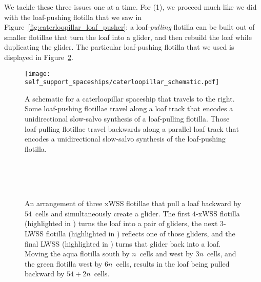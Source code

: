 We tackle these three issues one at a time. For (1), we proceed much like we did with the loaf-pushing flotilla that we saw in Figure~\ref{fig:caterloopillar_loaf_pusher}: a loaf-\emph{pulling} flotilla can be built out of smaller flotillae that turn the loaf into a glider, and then rebuild the loaf while duplicating the glider. The particular loaf-pushing flotilla that we used is displayed in Figure~\ref{fig:caterloopillar_loaf_puller}.

\begin{figure}[!htb]
	\centering
	\texttt{[image: self\_support\_spaceships/caterloopillar\_schematic.pdf]}
	\caption{A schematic for a caterloopillar spaceship that travels to the right. Some loaf-pushing flotillae travel along a loaf track that encodes a unidirectional slow-salvo synthesis of a loaf-pulling flotilla. Those loaf-pulling flotillae travel backwards along a parallel loaf track that encodes a unidirectional slow-salvo synthesis of the loaf-pushing flotilla.}\label{fig:caterloopillar_schematic}
\end{figure}

\begin{figure}[!htb]
	\centering
	 \\[1em]
	
	 \\[1em]
	
	 \\[1em]
	
	
	\caption{An arrangement of three xWSS flotillae that pull a loaf backward by $54$~cells and simultaneously create a glider. The first $4$-xWSS flotilla (highlighted in ) turns the loaf into a pair of gliders, the next $3$-LWSS flotilla (highlighted in ) reflects one of those gliders, and the final LWSS (highlighted in ) turns that glider back into a loaf. Moving the aqua flotilla south by $n$~cells and west by $3n$~cells, and the green flotilla west by $6n$~cells, results in the loaf being pulled backward by $54 + 2n$~cells.}\label{fig:caterloopillar_loaf_puller}
\end{figure}

